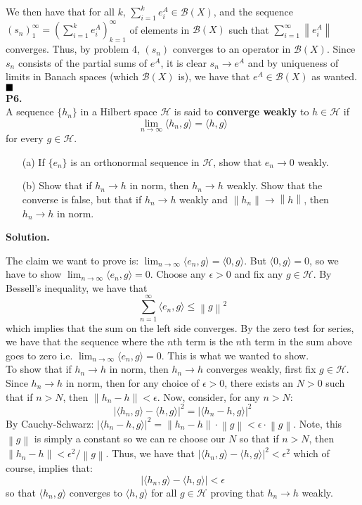 \documentclass{article}
\newcommand{\norm}[1]{\left\lVert#1\right\rVert}
\begin{document}
    We then have that for all $k$, 
    $\sum_{i=1}^k e^A_i\in\mathcal{B}(X)$, and the sequence $(s_n)_1^{\infty} = (\sum_{i=1}^k e^A_i)_{k=1}^{\infty}$ of elements
    in $\mathcal{B}(X)$ such that $\sum_{i=1}^{\infty} \norm{e^A_i}$ converges. Thus, by problem 4, $(s_n)$ converges to an operator
    in $\mathcal{B}(X)$. Since $s_n$ consists of the partial sums of $e^A$, it is clear $s_n \to e^A$ and by uniqueness of limits
    in Banach spaces (which $\mathcal{B}(X)$ is), we have that $e^A\in\mathcal{B}(X)$ as wanted.$\hfill\blacksquare$\\

    \textbf{P6.}\\

    A sequence $\{h_n\}$ in a Hilbert space $\mathcal{H}$ is said to \textbf{converge weakly} to $h\in\mathcal{H}$ if
    \[ \lim_{n\to\infty} \langle h_n,g\rangle = \langle h,g\rangle \]
    for every $g\in\mathcal{H}$.
    \begin{enumerate}
        \item[(a)] If $\{e_n\}$ is an orthonormal sequence in $\mathcal{H}$, show that $e_n\to 0$ weakly.
        \item[(b)] Show that if $h_n\to h$ in norm, then $h_n\to h$ weakly. Show that the converse is false, but that if
            $h_n\to h$ weakly and $\norm{h_n}\to\norm{h}$, then $h_n\to h$ in norm.
    \end{enumerate}

    \textbf{Solution.}

    The claim we want to prove is: $\lim_{n\to\infty} \langle e_n,g\rangle = \langle 0,g\rangle$. But $\langle 0,g\rangle = 0$,
    so we have to show $\lim_{n\to\infty} \langle e_n,g\rangle = 0$. Choose any $\epsilon>0$ and fix any $g\in\mathcal{H}$.
    By Bessell's inequality, we have that
    \[ \sum_{n=1}^{\infty} \langle e_n,g\rangle \leq \norm{g}^2 \]
    which implies that the sum on the left side converges. By the zero test for series, we have that the sequence where the $n$th
    term is the $n$th term in the sum above goes to zero i.e. $\lim_{n\to\infty} \langle e_n,g\rangle = 0$. This is what we wanted
    to show.\\

    To show that if $h_n\to h$ in norm, then $h_n\to h$ converges weakly, first fix $g\in\mathcal{H}$. Since $h_n\to h$ in norm,
    then for any choice of $\epsilon>0$, there exists an $N>0$ such that if $n>N$, then $\norm{h_n-h}<\epsilon$. Now, consider,
    for any $n>N$:
    \[
        |\langle h_n,g\rangle - \langle h,g\rangle|^2 = |\langle h_n-h,g\rangle|^2
    \]
    By Cauchy-Schwarz: $|\langle h_n-h,g\rangle|^2 = \norm{h_n-h}\cdot\norm{g}<\epsilon\cdot\norm{g}$. Note, this $\norm{g}$ is
    simply a constant so we can re choose our $N$ so that if $n>N$, then $\norm{h_n-h}<\epsilon^2/\norm{g}$. Thus, we have that
    $|\langle h_n,g\rangle-\langle h,g\rangle|^2 < \epsilon^2$ which of course, implies that:
    \[ |\langle h_n,g\rangle-\langle h,g\rangle| < \epsilon \]
    so that $\langle h_n,g\rangle$ converges to $\langle h,g\rangle$ for all $g\in\mathcal{H}$ proving that $h_n\to h$ weakly.\\
\end{document}
